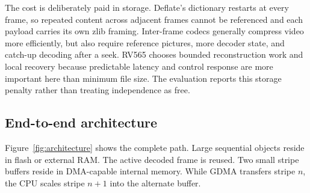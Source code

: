 \documentclass[11pt,twocolumn]{article}
\begin{document}
The cost is deliberately paid in storage.  Deflate's dictionary restarts at
every frame, so repeated content across adjacent frames cannot be referenced
and each payload carries its own zlib framing.  Inter-frame codecs generally
compress video more efficiently, but also require reference pictures, more
decoder state, and catch-up decoding after a seek.  RV565 chooses bounded
reconstruction work and local recovery because predictable latency and control
response are more important here than minimum file size.  The evaluation
reports this storage penalty rather than treating independence as free.

\subsection{End-to-end architecture}

Figure~\ref{fig:architecture} shows the complete path.  Large sequential
objects reside in flash or external RAM.  The active decoded frame is reused.
Two small stripe buffers reside in DMA-capable internal memory.  While GDMA
transfers stripe $n$, the CPU scales stripe $n+1$ into the alternate buffer.
\end{document}

